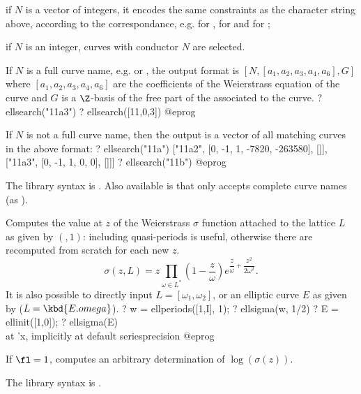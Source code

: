 \item if $N$ is a vector of integers, it encodes the same constraints
as the character string above, according to the 
correspondance, e.g. \kbd{[11,0,1]} for , \kbd{[11,0]} for
 and \kbd{[11]} for ;

\item if $N$ is an integer, curves with conductor $N$ are selected.

If $N$ is a full curve name, e.g.  or \kbd{[11,0,1]},
the output format is $[N, [a_1,a_2,a_3,a_4,a_6], G]$ where
$[a_1,a_2,a_3,a_4,a_6]$ are the coefficients of the Weierstrass equation of
the curve and $G$ is a $\Z$-basis of the free part of the  associated to the curve.
\bprog
? ellsearch("11a3")
? ellsearch([11,0,3])
@eprog\noindent

If $N$ is not a full curve name, then the output is a vector of all matching
curves in the above format:
\bprog
? ellsearch("11a")
      ["11a2", [0, -1, 1, -7820, -263580], []],
      ["11a3", [0, -1, 1, 0, 0], []]]
? ellsearch("11b")
@eprog

The library syntax is .
Also available is  that only
accepts complete curve names (as ).

\label{se:ellsigma}
Computes the value at $z$ of the Weierstrass $\sigma$ function attached to
the lattice $L$ as given by $(,1)$: including quasi-periods
is useful, otherwise there are recomputed from scratch for each new $z$.
$$ \sigma(z, L) = z \prod_{\omega\in L^*} \left(1 -
\dfrac{z}{\omega}\right)e^{\dfrac{z}{\omega} + \dfrac{z^2}{2\omega^2}}.$$
It is also possible to directly input $L = [\omega_1,\omega_2]$,
or an elliptic curve $E$ as given by  ($L = \kbd{E.omega}$).
\bprog
? w = ellperiods([1,I], 1);
? ellsigma(w, 1/2)
? E = ellinit([1,0]);
? ellsigma(E) \\ at 'x, implicitly at default seriesprecision
@eprog

If $\fl=1$, computes an arbitrary determination of $\log(\sigma(z))$.

The library syntax is .

